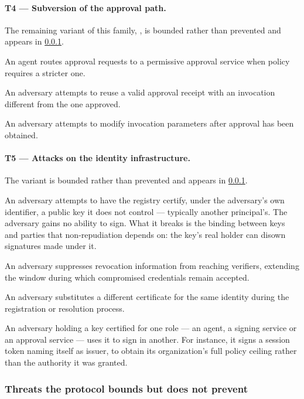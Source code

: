 \documentclass[11pt,a4paper]{article}
\begin{document}
\paragraph{T4 --- Subversion of the approval path.}
The remaining variant of this family, , is bounded rather
than prevented and appears in \cref{sec:threat-bounded}.

 An agent routes approval requests
to a permissive approval service when policy requires a stricter one.

 An adversary attempts to
reuse a valid approval receipt with an invocation different from the one
approved.

 An adversary
attempts to modify invocation parameters after approval has been
obtained.

\paragraph{T5 --- Attacks on the identity infrastructure.}
The variant  is bounded rather than prevented and appears
in \cref{sec:threat-bounded}.

 An adversary attempts
to have the registry certify, under the adversary's own identifier, a
public key it does not control --- typically another principal's. The
adversary gains no ability to sign. What it breaks is the binding
between keys and parties that non-repudiation depends on: the key's
real holder can disown signatures made under it.

 An adversary suppresses revocation
information from reaching verifiers, extending the window during which
compromised credentials remain accepted.

 An adversary substitutes a
different certificate for the same identity during the registration or
resolution process.

 An adversary holding a key certified for
one role --- an agent, a signing service or an approval service --- uses
it to sign in another. For instance, it signs a session token naming
itself as issuer, to obtain its organization's full policy ceiling
rather than the authority it was granted.

\subsubsection{Threats the protocol bounds but does not prevent}
\label{sec:threat-bounded}
\end{document}
